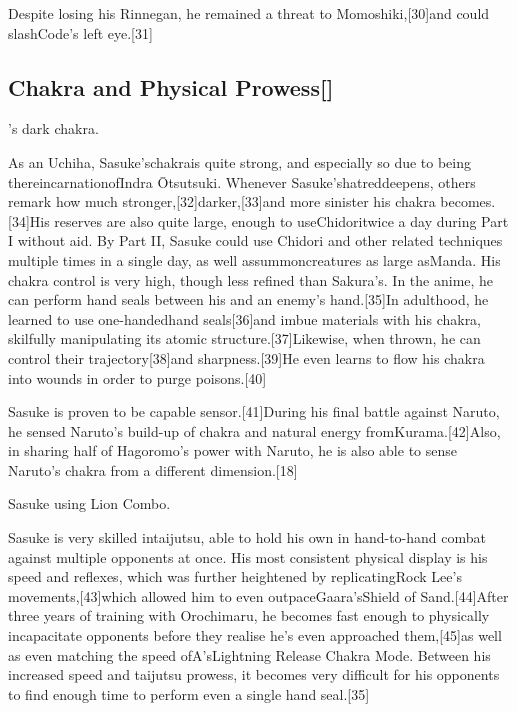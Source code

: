 \documentclass[a4paper,12pt]{article}
\begin{document}
Despite losing his Rinnegan, he remained a threat to Momoshiki,[30]and could slashCode's left eye.[31]\\ \par \vspace{0.5cm}

\subsection*{Chakra and Physical Prowess[]}\n\nSasuke's dark chakra.\\ \par \vspace{0.5cm}

As an Uchiha, Sasuke'schakrais quite strong, and especially so due to being thereincarnationofIndra Ōtsutsuki. Whenever Sasuke'shatreddeepens, others remark how much stronger,[32]darker,[33]and more sinister his chakra becomes.[34]His reserves are also quite large, enough to useChidoritwice a day during Part I without aid. By Part II, Sasuke could use Chidori and other related techniques multiple times in a single day, as well assummoncreatures as large asManda. His chakra control is very high, though less refined than Sakura's. In the anime, he can perform hand seals between his and an enemy's hand.[35]In adulthood, he learned to use one-handedhand seals[36]and imbue materials with his chakra, skilfully manipulating its atomic structure.[37]Likewise, when thrown, he can control their trajectory[38]and sharpness.[39]He even learns to flow his chakra into wounds in order to purge poisons.[40]\\ \par \vspace{0.5cm}

Sasuke is proven to be capable sensor.[41]During his final battle against Naruto, he sensed Naruto's build-up of chakra and natural energy fromKurama.[42]Also, in sharing half of Hagoromo's power with Naruto, he is also able to sense Naruto's chakra from a different dimension.[18]\\ \par \vspace{0.5cm}

Sasuke using Lion Combo.\\ \par \vspace{0.5cm}

Sasuke is very skilled intaijutsu, able to hold his own in hand-to-hand combat against multiple opponents at once. His most consistent physical display is his speed and reflexes, which was further heightened by replicatingRock Lee's movements,[43]which allowed him to even outpaceGaara’sShield of Sand.[44]After three years of training with Orochimaru, he becomes fast enough to physically incapacitate opponents before they realise he's even approached them,[45]as well as even matching the speed ofA’sLightning Release Chakra Mode. Between his increased speed and taijutsu prowess, it becomes very difficult for his opponents to find enough time to perform even a single hand seal.[35]\\ \par \vspace{0.5cm}
\end{document}
